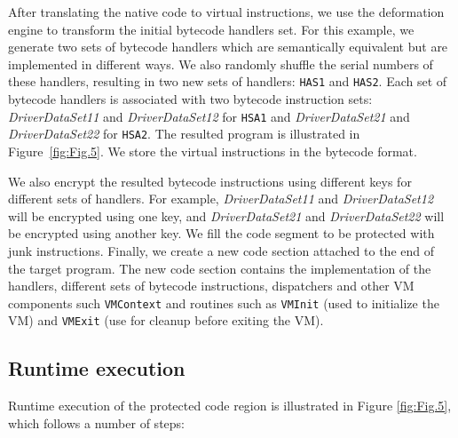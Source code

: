 \documentclass[conference]{IEEEtran}
\begin{document}
After translating the native code to virtual instructions, we use the deformation engine to transform the initial bytecode handlers set. For this example, we generate two sets of bytecode handlers which are semantically equivalent but are implemented in different ways.
We also randomly shuffle the serial numbers of these handlers, resulting in two new sets of handlers: \texttt{HAS1} and \texttt{HAS2}.  Each set of bytecode handlers is associated with two bytecode instruction sets: \emph{DriverDataSet11} and \emph{DriverDataSet12} for \texttt{HSA1} and \emph{DriverDataSet21} and \emph{DriverDataSet22} for \texttt{HSA2}. The resulted program is illustrated in Figure~\ref{fig:Fig.5}. We store the virtual instructions in the bytecode format.


We also encrypt the resulted bytecode instructions using different keys for different sets of handlers. 
For example, \emph{DriverDataSet11} and \emph{DriverDataSet12} will be encrypted using one key, 
and \emph{DriverDataSet21} and \emph{DriverDataSet22} will be encrypted using another key. 
We fill the code segment to be protected with junk instructions.
Finally, we create a new code section attached to the end of the target program. 
The new code section contains the implementation of the handlers, different sets of bytecode instructions, 
dispatchers and other VM components such \texttt{VMContext} and routines such as 
\texttt{VMInit} (used to initialize the VM) and \texttt{VMExit} (use for cleanup before exiting the VM).



\subsection{Runtime execution}

Runtime execution of the protected code region is illustrated in Figure \ref{fig:Fig.5}, which follows a number of steps:
\end{document}

